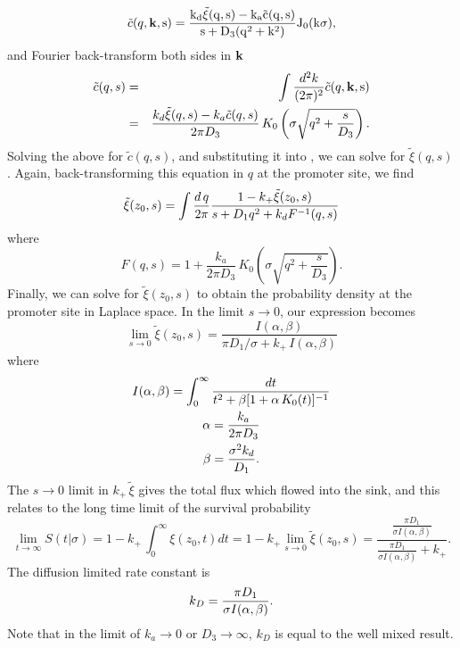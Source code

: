 \begin{equation}
 \tilde{c}(q,\bf k \rm, s) = \frac{k_d \tilde{\xi}(q,s) - k_a\tilde{c}(q,s)}{s + D_3(q^2 + k^2)} J_{0}(k \sigma ),
\end{equation}
and Fourier back-transform both sides in ${\bf k}$
\begin{eqnarray}
 \elabel{FourierBackC}
 \tilde{c}(q, s) & = & \int \frac{d^2 k}{(2 \pi)^2} \tilde{c}(q,\bf k \rm, s) \\
 & = & \frac{k_d \tilde{\xi}(q,s) - k_a\tilde{c}(q,s)}{2 \pi D_3} \, K_{0}\left( \sigma \sqrt{q^2 + \frac{s}{D_3}} \right).
\end{eqnarray}
Solving the above for $\tilde{c}(q,s)$, and substituting it into , we can solve for $\tilde{\xi}(q,s)$. Again, back-transforming this equation in $q$ at the promoter site, we find
\begin{equation}
 \tilde{\xi}(z_0, s) = \int \frac{d\,q}{2 \pi} \frac{1-k_+ \tilde{\xi}(z_0, s)}{s + D_1 q^2+k_d F^{-1}(q,s)}
 \elabel{FDE_dna2}
\end{equation}
where
\begin{equation}
F(q,s) = 1 + \frac{k_a}{2 \pi D_3} \, K_{0}\left( \sigma \sqrt{q^2 + \frac{s}{D_3}} \right).
\end{equation}
Finally, we can solve  for $\tilde{\xi}(z_0, s)$ to obtain the probability density at the promoter site in Laplace space. In the limit $s \to 0$, our expression becomes
\begin{equation}
 \lim_{s \to 0} \tilde{\xi}(z_0, s) = \frac{I(\alpha,\beta)}{\pi D_1 / \sigma + k_+ \, I(\alpha,\beta)}
\end{equation}
where
\begin{gather}
 I(\alpha,\beta) = \int_0^{\infty} \frac{dt}{t^2 + \beta[1 + \alpha \, K_0(t)]^{-1}} \\
 \alpha = \frac{k_a}{2 \pi D_3} \elabel{EqAlpha} \\
 \beta = \frac{\sigma^2 k_d}{D_1} \elabel{EqBeta}.
\end{gather}
The $s \to 0$ limit in $k_+ \, \tilde{\xi}$ gives the total flux which flowed into the sink, and this relates to the long time limit of the survival probability
\begin{equation}
  \lim_{t \to \infty}S(t|\sigma) = 1 - k_+ \, \int_0^{\infty} \xi(z_0, t) dt = 1 - k_+ \lim_{s \to 0} \tilde{\xi}(z_0, s) = \frac{\frac{\pi D_1}{\sigma I(\alpha,\beta)}}{\frac{\pi D_1}{\sigma I(\alpha,\beta)} + k_+}.
\end{equation}
The diffusion limited rate constant is
\begin{equation}
 k_D = \frac{\pi D_1}{\sigma I(\alpha,\beta)}.
 \elabel{kDFullJ}
\end{equation}
Note that in the limit of $k_a\to0$ or $D_3\to\infty$, $k_D$ is equal to the well mixed result.

